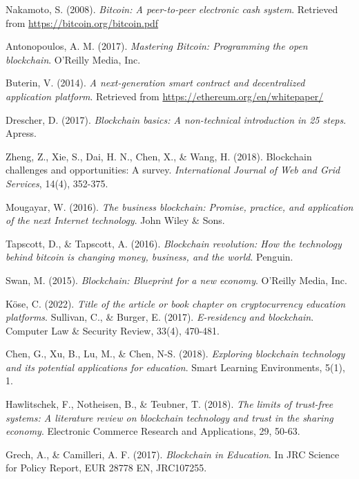 \documentclass[12pt]{report}
\begin{document}
\begin{thebibliography}{9}
Nakamoto, S. (2008). \textit{Bitcoin: A peer-to-peer electronic cash system}. Retrieved from \url{https://bitcoin.org/bitcoin.pdf}

Antonopoulos, A. M. (2017). \textit{Mastering Bitcoin: Programming the open blockchain}. O'Reilly Media, Inc.

Buterin, V. (2014). \textit{A next-generation smart contract and decentralized application platform}. Retrieved from \url{https://ethereum.org/en/whitepaper/}

Drescher, D. (2017). \textit{Blockchain basics: A non-technical introduction in 25 steps}. Apress.

Zheng, Z., Xie, S., Dai, H. N., Chen, X., \& Wang, H. (2018). Blockchain challenges and opportunities: A survey. \textit{International Journal of Web and Grid Services}, 14(4), 352-375.

Mougayar, W. (2016). \textit{The business blockchain: Promise, practice, and application of the next Internet technology}. John Wiley \& Sons.

Tapscott, D., \& Tapscott, A. (2016). \textit{Blockchain revolution: How the technology behind bitcoin is changing money, business, and the world}. Penguin.

Swan, M. (2015). \textit{Blockchain: Blueprint for a new economy}. O'Reilly Media, Inc.


Köse, C. (2022). \textit{Title of the article or book chapter on cryptocurrency education platforms}. 
Sullivan, C., \& Burger, E. (2017). \textit{E-residency and blockchain}. Computer Law \& Security Review, 33(4), 470-481.

Chen, G., Xu, B., Lu, M., \& Chen, N-S. (2018). \textit{Exploring blockchain technology and its potential applications for education}. Smart Learning Environments, 5(1), 1.

Hawlitschek, F., Notheisen, B., \& Teubner, T. (2018). \textit{The limits of trust-free systems: A literature review on blockchain technology and trust in the sharing economy}. Electronic Commerce Research and Applications, 29, 50-63.

Grech, A., \& Camilleri, A. F. (2017). \textit{Blockchain in Education}. In JRC Science for Policy Report, EUR 28778 EN, JRC107255.


\end{thebibliography}
\end{document}
